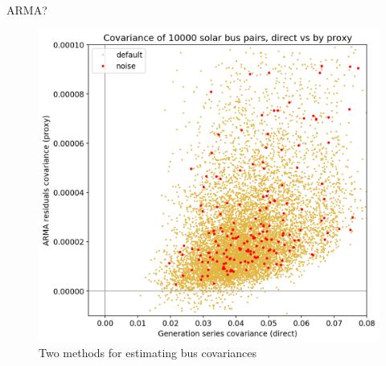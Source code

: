 \documentclass[10pt]{beamer}
\begin{document}
{
\begin{frame}[plain]
\end{frame}
}

\begin{frame}{ARMA?}
    \begin{figure}
        \centering
        \includegraphics[height=.65\paperheight]{img/cov_direct_vs_proxy_solar.png}
        \caption{Two methods for estimating bus covariances}
    \end{figure}
\end{frame}
\end{document}
